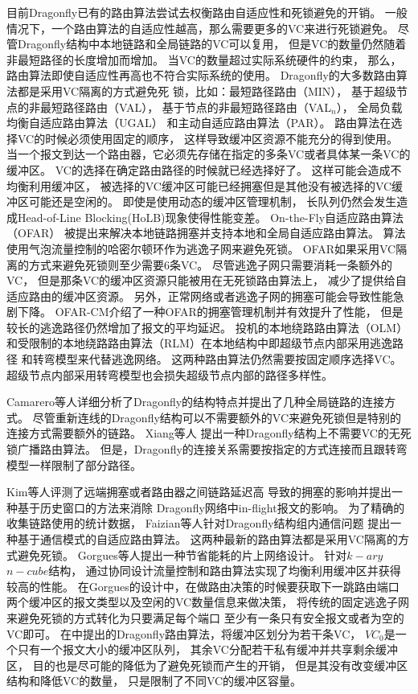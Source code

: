 目前Dragonfly已有的路由算法尝试去权衡路由自适应性和死锁避免的开销。
一般情况下，一个路由算法的自适应性越高，那么需要更多的VC来进行死锁避免。
尽管Dragonfly结构中本地链路和全局链路的VC可以复用，
但是VC的数量仍然随着非最短路径的长度增加而增加。
当VC的数量超过实际系统硬件的约束，
那么，路由算法即使自适应性再高也不符合实际系统的使用。
Dragonfly的大多数路由算法都是采用VC隔离的方式避免死
锁，比如：最短路径路由（MIN），
基于超级节点的非最短路径路由（VAL），
基于节点的非最短路径路由（VAL$_{n}$），
全局负载均衡自适应路由算法（UGAL）
和主动自适应路由算法（PAR）。
路由算法在选择VC的时候必须使用固定的顺序，
这样导致缓冲区资源不能充分的得到使用。
当一个报文到达一个路由器，它必须先存储在指定的多条VC或者具体某一条VC的缓冲区。
VC的选择在确定路由路径的时候就已经选择好了。
这样可能会造成不均衡利用缓冲区，
被选择的VC缓冲区可能已经拥塞但是其他没有被选择的VC缓冲区可能还是空闲的。
即使是使用动态的缓冲区管理机制，
长队列仍然会发生造成Head-of-Line Blocking(HoLB)现象使得性能变差。
On-the-Fly自适应路由算法（OFAR）
被提出来解决本地链路拥塞并支持本地和全局自适应路由算法。
算法使用气泡流量控制的哈密尔顿环作为逃逸子网来避免死锁。
OFAR如果采用VC隔离的方式来避免死锁则至少需要6条VC。
尽管逃逸子网只需要消耗一条额外的VC，
但是那条VC的缓冲区资源只能被用在无死锁路由算法上，
减少了提供给自适应路由的缓冲区资源。
另外，正常网络或者逃逸子网的拥塞可能会导致性能急剧下降。
OFAR-CM介绍了一种OFAR的拥塞管理机制并有效提升了性能，
但是较长的逃逸路径仍然增加了报文的平均延迟。
投机的本地绕路路由算法（OLM）
和受限制的本地绕路路由算法（RLM）在本地结构中即超级节点内部采用逃逸路径
和转弯模型来代替逃逸网络。
这两种路由算法仍然需要按固定顺序选择VC。
超级节点内部采用转弯模型也会损失超级节点内部的路径多样性。

Camarero等人详细分析了Dragonfly的结构特点并提出了几种全局链路的连接方式。
尽管重新连线的Dragonfly结构可以不需要额外的VC来避免死锁但是特别的连接方式需要额外的链路。
Xiang等人 提出一种Dragonfly结构上不需要VC的无死锁广播路由算法。
但是，Dragonfly的连接关系需要按指定的方式连接而且跟转弯模型一样限制了部分路径。

Kim等人评测了远端拥塞或者路由器之间链路延迟高
导致的拥塞的影响并提出一种基于历史窗口的方法来消除
Dragonfly网络中in-flight报文的影响。
为了精确的收集链路使用的统计数据，
Faizian等人针对Dragonfly结构组内通信问题
提出一种基于通信模式的自适应路由算法。
这两种最新的路由算法都是采用VC隔离的方式避免死锁。
Gorgues等人提出一种节省能耗的片上网络设计。
针对$k-ary$ $n-cube$结构，
通过协同设计流量控制和路由算法实现了均衡利用缓冲区并获得较高的性能。
在Gorgues的设计中，在做路由决策的时候要获取下一跳路由端口
两个缓冲区的报文类型以及空闲的VC数量信息来做决策，
将传统的固定逃逸子网来避免死锁的方式转化为只要满足每个端口
至少有一条只有安全报文或者为空的VC即可。
在中提出的Dragonfly路由算法，将缓冲区划分为若干条VC，
$VC_{0}$是一个只有一个报文大小的缓冲区队列，
其余VC分配若干私有缓冲并共享剩余缓冲区，
目的也是尽可能的降低为了避免死锁而产生的开销，
但是其没有改变缓冲区结构和降低VC的数量，
只是限制了不同VC的缓冲区容量。

